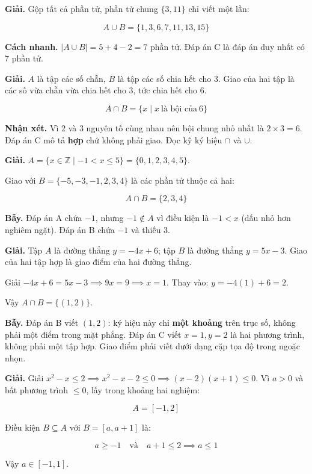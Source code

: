 \documentclass[11pt, a4paper]{article}
\begin{document}
\begin{dapan}[5 — Đáp án C]
\textbf{Giải.} Gộp tất cả phần tử, phần tử chung $\{3, 11\}$ chỉ viết một lần:

$$A \cup B = \{1, 3, 6, 7, 11, 13, 15\}$$

\textbf{Cách nhanh.} $|A \cup B| = 5 + 4 - 2 = 7$ phần tử. Đáp án C là đáp án duy nhất có $7$ phần tử.
\end{dapan}

\begin{dapan}[6 — Đáp án B]
\textbf{Giải.} $A$ là tập các số chẵn, $B$ là tập các số chia hết cho $3$. Giao của hai tập là các số vừa chẵn vừa chia hết cho $3$, tức chia hết cho $6$.

$$A \cap B = \{x \mid x \ \text{là bội của} \ 6\}$$

\textbf{Nhận xét.} Vì $2$ và $3$ nguyên tố cùng nhau nên bội chung nhỏ nhất là $2 \times 3 = 6$. Đáp án C mô tả \textbf{hợp} chứ không phải giao. Đọc kỹ ký hiệu $\cap$ và $\cup$.
\end{dapan}

\begin{dapan}[7 — Đáp án C]
\textbf{Giải.} $A = \{x \in \mathbb{Z} \mid -1 < x \le 5\} = \{0, 1, 2, 3, 4, 5\}$.

Giao với $B = \{-5, -3, -1, 2, 3, 4\}$ là các phần tử thuộc cả hai:

$$A \cap B = \{2, 3, 4\}$$

\textbf{Bẫy.} Đáp án A chứa $-1$, nhưng $-1 \notin A$ vì điều kiện là $-1 < x$ (dấu nhỏ hơn nghiêm ngặt). Đáp án B chứa $-1$ và thiếu $3$.
\end{dapan}

\begin{dapan}[8 — Đáp án D]
\textbf{Giải.} Tập $A$ là đường thẳng $y = -4x + 6$; tập $B$ là đường thẳng $y = 5x - 3$. Giao của hai tập hợp là giao điểm của hai đường thẳng.

Giải $-4x + 6 = 5x - 3 \implies 9x = 9 \implies x = 1$. Thay vào: $y = -4(1) + 6 = 2$.

Vậy $A \cap B = \{(1, 2)\}$.

\textbf{Bẫy.} Đáp án B viết $(1,2)$: ký hiệu này chỉ \textbf{một khoảng} trên trục số, không phải một điểm trong mặt phẳng. Đáp án C viết $x=1, y=2$ là hai phương trình, không phải một tập hợp. Giao điểm phải viết dưới dạng cặp tọa độ trong ngoặc nhọn.
\end{dapan}

\begin{dapan}[9 — Đáp án D]
\textbf{Giải.} Giải $x^2 - x \le 2 \implies x^2 - x - 2 \le 0 \implies (x-2)(x+1) \le 0$. Vì $a > 0$ và bất phương trình $\le 0$, lấy trong khoảng hai nghiệm:

$$A = [-1, 2]$$

Điều kiện $B \subseteq A$ với $B = [a, a+1]$ là:

$$a \ge -1 \quad \text{và} \quad a + 1 \le 2 \implies a \le 1$$

Vậy $a \in [-1, 1]$.
\end{dapan}
\end{document}
